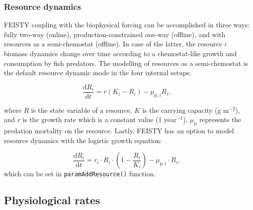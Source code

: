 \documentclass[
]{article}
\begin{document}
\subsubsection{Resource dynamics}\label{resource-dynamics}

FEISTY coupling with the biophysical forcing can be accomplished in
three ways: fully two-way (online), production-constrained one-way
(offline), and with resources as a semi-chemostat (offline). In case of
the latter, the resource \(i\) biomass dynamics change over time
according to a chemostat-like growth and consumption by fish predators.
The modelling of resources as a semi-chemostat is the default resource
dynamic mode in the four internal setups:

\begin{equation}
\dfrac{\mathrm{d}R_{i}}{\mathrm{d}t} =  r(K_i - R_i ) - \mu_{\mathrm{p},i} R_i, \label{eq:dRdt}
\end{equation}

where \(R\) is the state variable of a resource, \(K\) is the carrying
capacity (g m\(^{-2}\)), and \(r\) is the growth rate which is a
constant value (1 year\(^{-1}\)). \(\mu_{\mathrm{p}}\) represents the
predation mortality on the resource. Lastly, FEISTY has an option to
model resource dynamics with the logistic growth equation:

\begin{equation}
\frac{\mathrm{d}R_i}{\mathrm{d}t}=r_i \cdot R_i \cdot (1-\frac{R_i}{K_i}) - \mu_{\mathrm{p},i} \cdot R_i, \label{eq:dRdtlogistic}
\end{equation} which can be set in \texttt{paramAddResource()} function.

\subsection{Physiological rates}\label{physiological-rates}
\end{document}
